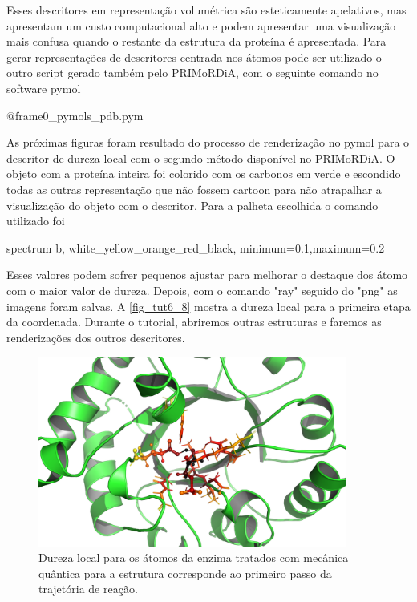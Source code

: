 \documentclass[a4paper,11pt]{refart}
\begin{document}
	 Esses descritores em representação volumétrica são esteticamente apelativos, mas apresentam um custo computacional alto e podem apresentar uma visualização mais confusa quando o restante da estrutura da proteína é apresentada. Para gerar representações de descritores centrada nos átomos pode ser utilizado o outro script gerado também pelo PRIMoRDiA, com o seguinte comando no software pymol
	 
	  \hspace*{-\leftmarginwidth}
	 \begin{minipage}{\fullwidth}\begin{pymol}@frame0_pymols_pdb.pym\end{pymol}
	 \end{minipage}
	 
	 	 
	 As próximas figuras foram resultado do processo de renderização no pymol para o descritor de dureza local com o segundo método disponível no PRIMoRDiA. O objeto com a proteína inteira foi colorido com os carbonos em verde e escondido todas as outras representação que não fossem cartoon para não atrapalhar a visualização do objeto com o descritor. Para a palheta escolhida o comando utilizado foi 
	 
	 \hspace*{-\leftmarginwidth}
	 \begin{minipage}{\fullwidth}\begin{pymol}spectrum b, white_yellow_orange_red_black, minimum=0.1,maximum=0.2
	 	\end{pymol}
	 \end{minipage}
	 
	 
	 Esses valores podem sofrer pequenos ajustar para melhorar o destaque dos átomo com o maior valor de dureza. Depois, com o comando "ray" seguido do "png" as imagens foram salvas. A \autoref{fig_tut6_8} mostra a dureza local para a primeira etapa da coordenada. Durante o tutorial, abriremos outras estruturas e faremos as renderizações dos outros descritores. 
	 
	 
	 \hspace*{-\leftmarginwidth}
	 \begin{minipage}{\fullwidth}
	 	\begin{figure}[H]
	 		\begin{center}
	 			\includegraphics[width=4in]{frame0_hardness}
	 			\caption{Dureza local para os átomos da enzima tratados com mecânica quântica para a estrutura corresponde ao primeiro passo da trajetória de reação. }
	 			\label{fig_tut6_8}
	 		\end{center}
	 	\end{figure}
	 \end{minipage}
	 
\end{document}

